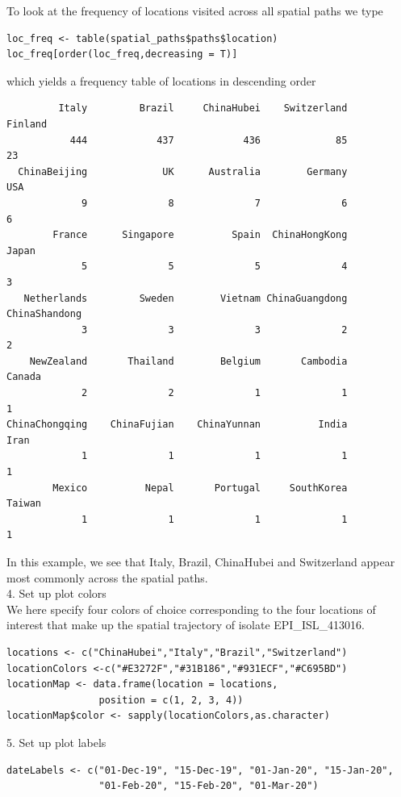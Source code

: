 \documentclass{article}
\begin{document}
To look at the frequency of locations visited across all spatial paths we type
\begin{verbatim}
loc_freq <- table(spatial_paths$paths$location)
loc_freq[order(loc_freq,decreasing = T)]
\end{verbatim}
which yields a frequency table of locations in descending order
\begin{verbatim}
         Italy         Brazil     ChinaHubei    Switzerland        Finland
           444            437            436             85             23
  ChinaBeijing             UK      Australia        Germany            USA
             9              8              7              6              6
        France      Singapore          Spain  ChinaHongKong          Japan
             5              5              5              4              3
   Netherlands         Sweden        Vietnam ChinaGuangdong  ChinaShandong
             3              3              3              2              2
    NewZealand       Thailand        Belgium       Cambodia         Canada
             2              2              1              1              1
ChinaChongqing    ChinaFujian    ChinaYunnan          India           Iran
             1              1              1              1              1
        Mexico          Nepal       Portugal     SouthKorea         Taiwan
             1              1              1              1              1
\end{verbatim}

In this example, we see that Italy, Brazil, ChinaHubei and Switzerland appear most commonly across the spatial paths. \\

4. Set up plot colors \\

We here specify four colors of choice corresponding to the four locations of interest that make up the spatial trajectory of isolate EPI\_ISL\_413016.

\begin{verbatim}
locations <- c("ChinaHubei","Italy","Brazil","Switzerland")
locationColors <-c("#E3272F","#31B186","#931ECF","#C695BD")
locationMap <- data.frame(location = locations,
                position = c(1, 2, 3, 4))
locationMap$color <- sapply(locationColors,as.character)
\end{verbatim}

5. Set up plot labels
\begin{verbatim}
dateLabels <- c("01-Dec-19", "15-Dec-19", "01-Jan-20", "15-Jan-20",
                "01-Feb-20", "15-Feb-20", "01-Mar-20")
\end{verbatim}
\end{document}
